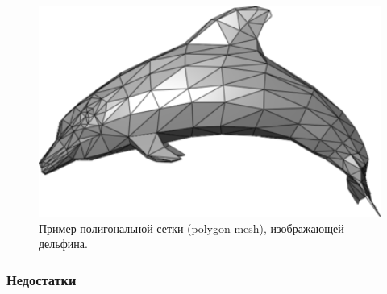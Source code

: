 \begin{figure}[H]
\begin{center}
\begin{minipage}[H]{0.4\linewidth}
            \includegraphics[width=1\textwidth]{mesh.png}
            \caption{Пример полигональной сетки (polygon mesh), изображающей дельфина.}
            \label{ris:image3}
        \end{minipage}
    \end{center}
\end{figure}

\subsubsection*{Недостатки}

